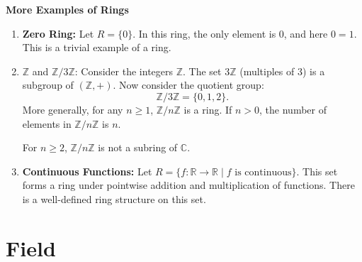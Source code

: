 \documentclass{article}
\begin{document}
\textbf{More Examples of Rings}
\begin{enumerate}
    \item \textbf{Zero Ring:} Let $R = \{0\}$. In this ring, the only element is $0$, and here $0 = 1$. This is a trivial example of a ring.

    \item \(\mathbb{Z}\) and \(\mathbb{Z}/3\mathbb{Z}\): Consider the integers \(\mathbb{Z}\). The set \(3\mathbb{Z}\) (multiples of 3) is a subgroup of \((\mathbb{Z}, +)\). Now consider the quotient group:
    \[
    \mathbb{Z}/3\mathbb{Z} = \{0, 1, 2\}.
    \]
    More generally, for any \(n \geq 1\), \(\mathbb{Z}/n\mathbb{Z}\) is a ring. If \(n > 0\), the number of elements in \(\mathbb{Z}/n\mathbb{Z}\) is \(n\).
    
    \begin{rmk}
        For \(n \geq 2\), \(\mathbb{Z}/n\mathbb{Z}\) is not a subring of \(\mathbb{C}\).
    \end{rmk}

    \item \textbf{Continuous Functions:} Let \(R = \{f: \mathbb{R} \to \mathbb{R} \mid f \text{ is continuous}\}\). This set forms a ring under pointwise addition and multiplication of functions. There is a well-defined ring structure on this set.
\end{enumerate}


\section{Field}
\end{document}

